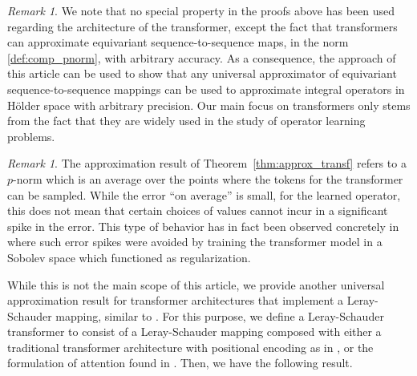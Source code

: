 \documentclass[a4paper,12pt,reqno]{amsart}
\theoremstyle{definition}
\theoremstyle{remark}
\newtheorem{rmk}[thm]{Remark}
\begin{document}
\begin{rmk}
    {\rm 
        We note that no special property in the proofs above has been used regarding the architecture of the transformer, except the fact that transformers can approximate equivariant sequence-to-sequence maps, in the norm \eqref{def:comp_pnorm}, with arbitrary accuracy. As a consequence, the approach of this article can be used to show that any universal approximator of equivariant sequence-to-sequence mappings can be used to approximate integral operators in H\"older space with arbitrary precision. Our main focus on transformers only stems from the fact that they are widely used in the study of operator learning problems. 
    }
\end{rmk}

\begin{rmk}
    {\rm 
        The approximation result of Theorem~\ref{thm:approx_transf} refers to a $p$-norm which is an average over the points where the tokens for the transformer can be sampled. While the error ``on average'' is small, for the learned operator, this does not mean that certain choices of values cannot incur in a significant spike in the error. This type of behavior has in fact been observed concretely in \cite{CST} where such error spikes were avoided by training the transformer model in a Sobolev space which functioned as regularization.
    }
\end{rmk}

While this is not the main scope of this article, we provide another universal approximation result for transformer architectures that implement a Leray-Schauder mapping, similar to \cite{zappala2024leray}. For this purpose, we define a Leray-Schauder transformer to consist of a Leray-Schauder mapping composed with either a traditional transformer architecture with positional encoding as in \cite{yun2019transformers,cordonnier2019relationship}, or the formulation of attention found in \cite{fang2022attention}. Then, we have the following result. 
\end{document}
